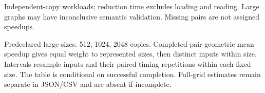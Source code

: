 \documentclass{article}
\begin{document}
\noindent Independent-copy workloads; reduction time excludes loading and reading. Large graphs may have inconclusive semantic validation. Missing pairs are not assigned speedups.
\quad\par\medskip
\quad\par\medskip
\quad\par\medskip
\quad\par\medskip
\quad\par\medskip
\clearpage\noindent Predeclared large sizes: 512, 1024, 2048 copies. Completed-pair geometric mean speedup gives equal weight to represented sizes, then distinct inputs within size. Intervals resample inputs and their paired timing repetitions within each fixed size. The table is conditional on successful completion. Full-grid estimates remain separate in JSON/CSV and are absent if incomplete.\par\medskip

\end{document}
